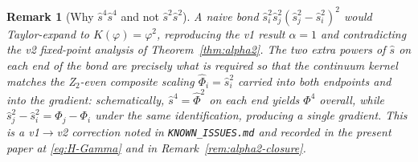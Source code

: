 \documentclass[11pt,a4paper]{article}
\renewcommand{\Phi}{\varPhi}
\newtheorem{remark}[axiom]{Remark}
\begin{document}
\begin{remark}[Why $\hat{s}^{4}\hat{s}^{4}$ and not $\hat{s}^{2}\hat{s}^{2}$]
\label{rem:bond-power}
A naive bond \(\hat{s}_{i}^{2}\hat{s}_{j}^{2}(\hat{s}_{j}^{2}-\hat{s}_{i}^{2})^{2}\)
would Taylor-expand to \(K(\varphi)=\varphi^{2}\), reproducing the
v1 result \(\alpha=1\) and contradicting the v2 fixed-point analysis
of Theorem~\ref{thm:alpha2}. The two extra powers of \(\hat{s}\) on
each end of the bond are precisely what is required so that the
continuum kernel matches the Z$_{2}$-even composite scaling
\(\hat{\Phi}_{i}=\hat{s}_{i}^{2}\) carried into both endpoints
\emph{and} into the gradient: schematically, \(\hat{s}^{4}=\hat{\Phi}^{2}\)
on each end yields \(\Phi^{4}\) overall, while
\(\hat{s}_{j}^{2}-\hat{s}_{i}^{2}=\Phi_{j}-\Phi_{i}\) under the same
identification, producing a single gradient. This is a v1$\to$v2
correction noted in \texttt{KNOWN\_ISSUES.md} and recorded in the
present paper at \eqref{eq:H-Gamma} and in Remark~\ref{rem:alpha2-closure}.
\end{remark}
\end{document}
